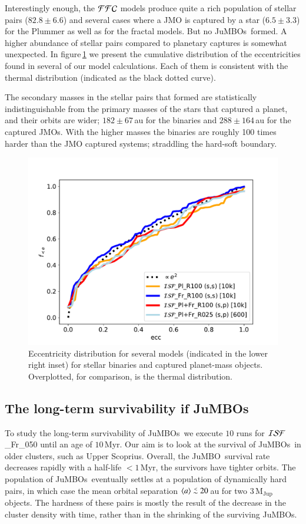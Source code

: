 \documentclass[submission,phys]{lib/SciPost}
\def\aplt{\ {\raise-.5ex\hbox{$\buildrel<\over\sim$}}\ }
\newcommand{\jumbo}{\mbox{JuMBO}}
\newcommand{\jumbos}{\mbox{JuMBOs}}
\begin{document}
Interestingly enough, the ${\cal FFC}$ models produce quite a rich
population of stellar pairs ($82.8\pm 6.6$) and several cases where a
JMO is captured by a star ($6.5\pm3.3$) for the Plummer as well as for
the fractal models. But no \jumbos\, formed. A higher abundance of
stellar pairs compared to planetary captures is somewhat unexpected.
In figure\,\ref{Fig:eccentricity_FFC_Fr025} we present the cumulative
distribution of the eccentricities found in several of our model
calculations. Each of them is consistent with the thermal distribution
(indicated as the black dotted curve).

The secondary masses in the stellar pairs that formed are
statistically indistinguishable from the primary masses of the stars
that captured a planet, and their orbits are wider; $182\pm67$\,au for
the binaries and $288\pm164$\,au for the captured JMOs.  With the
higher masses the binaries are roughly 100 times harder than the JMO
captured systems; straddling the hard-soft boundary.

\begin{figure}
    \centering
        \includegraphics[width=0.75\columnwidth]{figures/fig_eccentricity_FFC.pdf}
        \caption{Eccentricity distribution for several models
          (indicated in the lower right inset) for stellar binaries and
          captured planet-mass objects. Overplotted, for comparison,
          is the thermal distribution.}
         \label{Fig:eccentricity_FFC_Fr025}
\end{figure}

\subsection{The long-term survivability if \jumbos}

To study the long-term survivability of \jumbos\, we execute $10$ runs
for ${\cal ISF}$\_Fr\_050 until an age of $10$\,Myr.  Our aim is to look 
at the survival of \jumbos\, in older clusters, such as Upper Scoprius. Overall,
the \jumbo\, survival rate decreases rapidly with a half-life
$<1$\,Myr, the survivors have tighter orbits.  The population of
\jumbos\, eventually settles at a population of dynamically hard
pairs, in which case the mean orbital separation $\langle a\rangle
\aplt 20$\,au for two $3\, \mathrm{M_{\mathrm{Jup}}}$ objects. The hardness of
these pairs is mostly the result of the decrease in the cluster
density with time, rather than in the shrinking of the surviving
\jumbos.
\end{document}
